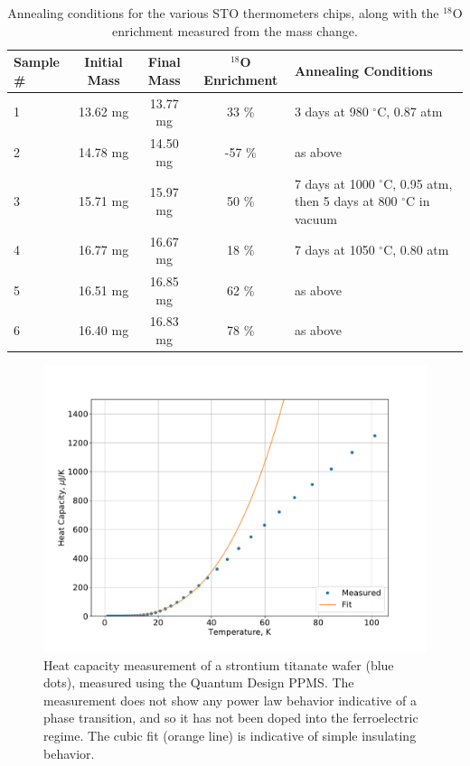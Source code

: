 \documentclass{thesis-umich}
\begin{document}
\begin{table}
	\label{tab:annealed_sto}
	\begin{tabular}{l|c|c|c|p{}}
		\hline
		Sample \# & Initial Mass & Final Mass & $^{18}$O Enrichment & Annealing Conditions \\
		\hline
		1 & 13.62 mg & 13.77 mg & 33 \% & 3 days at 980 $^\circ$C, 0.87 atm \\
		2 & 14.78 mg & 14.50 mg & -57 \% & as above \\
		3 & 15.71 mg & 15.97 mg & 50 \% & 7 days at 1000 $^\circ$C, 0.95 atm, then 5 days at 800 $^\circ$C in vacuum \\
		4 & 16.77 mg & 16.67 mg & 18 \% & 7 days at 1050 $^\circ$C, 0.80 atm \\
		5 & 16.51 mg & 16.85 mg & 62 \% & as above \\
		6 & 16.40 mg & 16.83 mg & 78 \% & as above \\
		\hline
	\end{tabular}
	\caption[Annealed STO Thermometers]{Annealing conditions for the various STO thermometers chips, along with the $^{18}$O enrichment measured from the mass change.}
\end{table}

\begin{figure} \caption[Annealed STO Heat Capacity]{Heat capacity measurement of a strontium titanate wafer
(blue dots), measured using the Quantum Design PPMS. The measurement does not
show any power law behavior indicative of a phase transition, and so it has not
been doped into the ferroelectric regime. The cubic fit (orange line) is
indicative of simple insulating behavior.}
\includegraphics[width=0.9\columnwidth]{figures/annealed_sto_heatcap_vs_t.pdf}
\end{figure}
\end{document}
